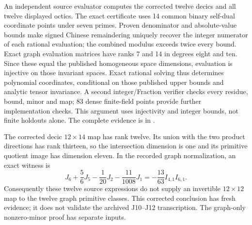 \documentclass[11pt]{article}
\begin{document}
An independent source evaluator computes the corrected twelve decics and
all twelve displayed octics. The exact certificate uses 14 common binary
self-dual coordinate points under seven primes. Proven denominator and
absolute-value bounds make signed Chinese remaindering uniquely recover
the integer numerator of each rational evaluation; the combined modulus
exceeds twice every bound. Exact graph evaluation matrices have ranks 7 and
14 in degrees eight and ten. Since these equal the published homogeneous
space dimensions, evaluation is injective on those invariant spaces.
Exact rational solving thus determines polynomial coordinates, conditional
on those published upper bounds and analytic tensor invariance. A second
integer/Fraction verifier checks every residue, bound, minor and map; 83
dense finite-field points provide further implementation checks. This
argument uses injectivity and integer bounds, not finite holdouts alone.
The complete evidence is in
.

The corrected decic $12\times14$ map has rank twelve. Its union with the two
product directions has rank thirteen, so the intersection dimension is one
and its primitive quotient image has dimension eleven. In the recorded
graph normalization, an exact witness is
\[
 J_6+\frac56J_5-\frac1{20}J_2-\frac{11}{1008}J_1
 =-\frac{13}{63}I_{4,1}I_{6,1}.
\]
Consequently these twelve source expressions do not supply an invertible
$12\times12$ map to the twelve graph primitive classes. This corrected
conclusion has fresh evidence; it does not validate the archived J10--J12
transcription. The graph-only nonzero-minor proof has separate inputs.
\end{document}

